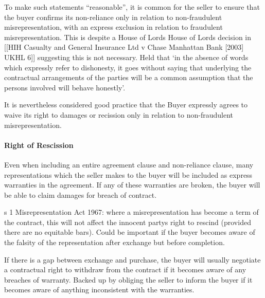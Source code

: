 \documentclass[
]{article}
\newenvironment{Shaded}{}{}
\newcommand{\NormalTok}[1]{#1}
\begin{document}
To make such statements ``reasonable'', it is common for the seller to
ensure that the buyer confirms its non-reliance only in relation to
non-fraudulent misrepresentation, with an express exclusion in relation
to fraudulent misrepresentation. This is despite a House of Lords House
of Lords decision in {[}{[}HIH Casualty and General Insurance Ltd v
Chase Manhattan Bank {[}2003{]} UKHL 6{]}{]} suggesting this is not
necessary. Held that `in the absence of words which expressly refer to
dishonesty, it goes without saying that underlying the contractual
arrangements of the parties will be a common assumption that the persons
involved will behave honestly'.

\begin{Shaded}
\begin{Highlighting}[]
\NormalTok{It is nevertheless considered good practice that the Buyer expressly agrees to waive its right to damages or recission only in relation to non{-}fraudulent misrepresentation.}
\end{Highlighting}
\end{Shaded}

\hypertarget{right-of-rescission}{%
\paragraph{Right of Rescission}\label{right-of-rescission}}

Even when including an entire agreement clause and non-reliance clause,
many representations which the seller makes to the buyer will be
included as express warranties in the agreement. If any of these
warranties are broken, the buyer will be able to claim damages for
breach of contract.

\begin{Shaded}
\begin{Highlighting}[]
\NormalTok{s 1 Misrepresentation Act 1967: where a misrepresentation has become a term of the contract, this will not affect the innocent party\textquotesingle{}s right to rescind (provided there are no equitable bars). Could be important if the buyer becomes aware of the falsity of the representation after exchange but before completion.}
\end{Highlighting}
\end{Shaded}

If there is a gap between exchange and purchase, the buyer will usually
negotiate a contractual right to withdraw from the contract if it
becomes aware of any breaches of warranty. Backed up by obliging the
seller to inform the buyer if it becomes aware of anything inconsistent
with the warranties.
\end{document}
